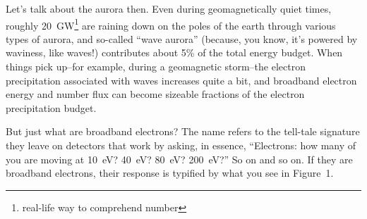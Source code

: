 Let's talk about the aurora then. Even during geomagnetically quiet
times, roughly 20~GW\footnote{real-life way to comprehend number}
\citep{Newell2009} are raining down on the poles of the earth through
various types of aurora, and so-called ``wave aurora'' (because, you
know, it's powered by waviness, like \Alf waves!) contributes about
5\% of the total energy budget. When things pick up--for example,
during a geomagnetic storm--the electron precipitation associated with
\Alf waves increases quite a bit, and broadband electron energy and
number flux can become sizeable fractions of the electron
precipitation budget.

But just what are broadband electrons? The name refers to the
tell-tale signature they leave on detectors that work by asking, in
essence, ``Electrons: how many of you are moving at 10~eV? 40~eV?
80~eV? 200~eV?'' So on and so on. If they are broadband electrons,
their response is typified by what you see in Figure~1.%
% 
% 
\setlength\parindent{\savedparindent}
\setlength\parskip{\savedparskip}



